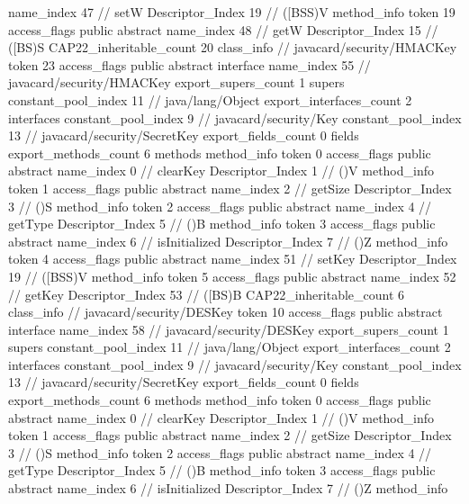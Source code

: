{{{{{					name_index	47		// setW
					Descriptor_Index	19		// ([BSS)V
				}
				method_info {
					token	19
					access_flags	public abstract
					name_index	48		// getW
					Descriptor_Index	15		// ([BS)S
				}
			}
			CAP22_inheritable_count	20
		}
		class_info {		// javacard/security/HMACKey
			token	23
			access_flags	public abstract interface
			name_index	55		// javacard/security/HMACKey
			export_supers_count	1
			supers {
				constant_pool_index	11		// java/lang/Object
			}
			export_interfaces_count	2
			interfaces {
				constant_pool_index	9		// javacard/security/Key
				constant_pool_index	13		// javacard/security/SecretKey
			}
			export_fields_count	0
			fields {
			}
			export_methods_count	6
			methods {
				method_info {
					token	0
					access_flags	public abstract
					name_index	0		// clearKey
					Descriptor_Index	1		// ()V
				}
				method_info {
					token	1
					access_flags	public abstract
					name_index	2		// getSize
					Descriptor_Index	3		// ()S
				}
				method_info {
					token	2
					access_flags	public abstract
					name_index	4		// getType
					Descriptor_Index	5		// ()B
				}
				method_info {
					token	3
					access_flags	public abstract
					name_index	6		// isInitialized
					Descriptor_Index	7		// ()Z
				}
				method_info {
					token	4
					access_flags	public abstract
					name_index	51		// setKey
					Descriptor_Index	19		// ([BSS)V
				}
				method_info {
					token	5
					access_flags	public abstract
					name_index	52		// getKey
					Descriptor_Index	53		// ([BS)B
				}
			}
			CAP22_inheritable_count	6
		}
		class_info {		// javacard/security/DESKey
			token	10
			access_flags	public abstract interface
			name_index	58		// javacard/security/DESKey
			export_supers_count	1
			supers {
				constant_pool_index	11		// java/lang/Object
			}
			export_interfaces_count	2
			interfaces {
				constant_pool_index	9		// javacard/security/Key
				constant_pool_index	13		// javacard/security/SecretKey
			}
			export_fields_count	0
			fields {
			}
			export_methods_count	6
			methods {
				method_info {
					token	0
					access_flags	public abstract
					name_index	0		// clearKey
					Descriptor_Index	1		// ()V
				}
				method_info {
					token	1
					access_flags	public abstract
					name_index	2		// getSize
					Descriptor_Index	3		// ()S
				}
				method_info {
					token	2
					access_flags	public abstract
					name_index	4		// getType
					Descriptor_Index	5		// ()B
				}
				method_info {
					token	3
					access_flags	public abstract
					name_index	6		// isInitialized
					Descriptor_Index	7		// ()Z
				}
				method_info {
}}}}}
